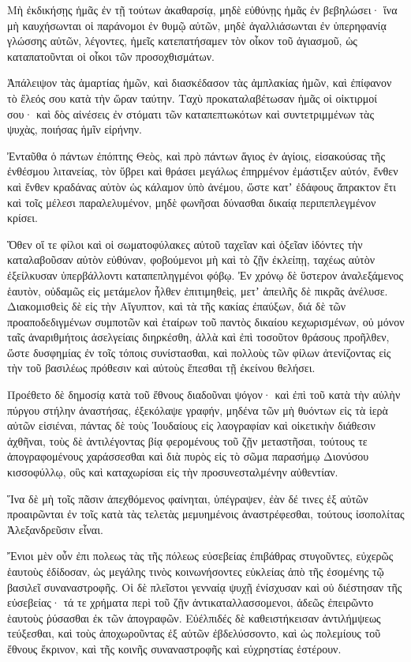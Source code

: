 {Μὴ ἐκδικήσῃς ἡμᾶς ἐν τῇ τούτων ἀκαθαρσίᾳ, μηδὲ εὐθύνῃς ἡμᾶς ἐν βεβηλώσει· ἵνα μὴ καυχήσωνται οἱ παράνομοι ἐν θυμῷ αὐτῶν, μηδὲ ἀγαλλιάσωνται ἐν ὑπερηφανίᾳ γλώσσης αὐτῶν, λέγοντες,
ἡμεῖς κατεπατήσαμεν τὸν οἶκον τοῦ ἁγιασμοῦ, ὡς καταπατοῦνται οἱ οἶκοι τῶν προσοχθισμάτων.
\par }{\PP {}Ἀπάλειψον τὰς ἁμαρτίας ἡμῶν, καὶ διασκέδασον τὰς ἀμπλακίας ἡμῶν, καὶ ἐπίφανον τὸ ἔλεός σου κατὰ τὴν ὥραν ταύτην.
Ταχὺ προκαταλαβέτωσαν ἡμᾶς οἱ οἰκτιρμοί σου· καὶ δὸς αἰνέσεις ἐν στόματι τῶν καταπεπτωκότων καὶ συντετριμμένων τὰς ψυχὰς, ποιήσας ἡμῖν εἰρήνην.
\par }{\PP {}Ἐνταῦθα ὁ πάντων ἐπόπτης Θεὸς, καὶ πρὸ πάντων ἅγιος ἐν ἁγίοις, εἰσακούσας τῆς ἐνθέσμου λιτανείας, τὸν ὕβρει καὶ θράσει μεγάλως ἐπηρμένον ἐμάστιξεν αὐτόν,
ἔνθεν καὶ ἔνθεν κραδάνας αὐτὸν ὡς κάλαμον ὑπὸ ἀνέμου, ὥστε κατʼ ἐδάφους ἄπρακτον ἔτι καὶ τοῖς μέλεσι παραλελυμένον, μηδὲ φωνῆσαι δύνασθαι δικαίᾳ περιπεπλεγμένον κρίσει.
\par }{\PP {}Ὅθεν οἵ τε φίλοι καὶ οἱ σωματοφύλακες αὐτοῦ ταχεῖαν καὶ ὀξεῖαν ἰδόντες τὴν καταλαβοῦσαν αὐτὸν εὐθύναν, φοβούμενοι μὴ καὶ τὸ ζῇν ἐκλείπῃ, ταχέως αὐτὸν ἐξείλκυσαν ὑπερβάλλοντι καταπεπληγμένοι φόβῳ.
Ἐν χρόνῳ δὲ ὕστερον ἀναλεξάμενος ἑαυτὸν, οὐδαμῶς εἰς μετάμελον ἦλθεν ἐπιτιμηθεὶς, μετʼ ἀπειλῆς δὲ πικρᾶς ἀνέλυσε.
Διακομισθεὶς δὲ εἰς τὴν Αἴγυπτον, καὶ τὰ τῆς κακίας ἐπαύξων, διά δὲ τῶν προαποδεδιγμένων συμποτῶν καὶ ἑταίρων τοῦ παντὸς δικαίου κεχωρισμένων,
οὐ μόνον ταῖς ἀναριθμήτοις ἀσελγείαις διηρκέσθη, ἀλλὰ καὶ ἐπὶ τοσοῦτον θράσους προῆλθεν, ὥστε δυσφημίας ἐν τοῖς τόποις συνίστασθαι, καὶ πολλοὺς τῶν φίλων ἀτενίζοντας εἰς τὴν τοῦ βασιλέως πρόθεσιν καὶ αὐτοὺς ἕπεσθαι τῇ ἐκείνου θελήσει.
\par }{\PP {}Προέθετο δὲ δημοσίᾳ κατὰ τοῦ ἔθνους διαδοῦναι ψόγον· καὶ ἐπὶ τοῦ κατὰ τὴν αὐλὴν πύργου στήλην ἀναστήσας, ἐξεκόλαψε γραφήν,
μηδένα τῶν μὴ θυόντων εἰς τὰ ἱερὰ αὐτῶν εἰσιέναι, πάντας δὲ τοὺς Ἰουδαίους εἰς λαογραφίαν καὶ οἰκετικὴν διάθεσιν ἀχθῆναι, τοὺς δὲ ἀντιλέγοντας βίᾳ φερομένους τοῦ ζῇν μεταστῆσαι,
τούτους τε ἀπογραφομένους χαράσσεσθαι καὶ διὰ πυρὸς εἰς τὸ σῶμα παρασήμῳ Διονύσου κισσοφύλλῳ, οὓς καὶ καταχωρίσαι εἰς τὴν προσυνεσταλμένην αὐθεντίαν.
\par }{\PP {}Ἵνα δὲ μὴ τοῖς πᾶσιν ἀπεχθόμενος φαίνηται, ὑπέγραψεν, ἐὰν δέ τινες ἐξ αὐτῶν προαιρῶνται ἐν τοῖς κατὰ τὰς τελετὰς μεμυημένοις ἀναστρέφεσθαι, τούτους ἰσοπολίτας Ἀλεξανδρεῦσιν εἶναι.
\par }{\PP {}Ἔνιοι μὲν οὖν ἐπι πολεως τὰς τῆς πόλεως εὐσεβείας ἐπιβάθρας στυγοῦντες, εὐχερῶς ἑαυτοὺς ἐδίδοσαν, ὡς μεγάλης τινὸς κοινωνήσοντες εὐκλείας ἀπὸ τῆς ἐσομένης τῷ βασιλεῖ συναναστροφῆς.
Οἱ δὲ πλεῖστοι γενναίᾳ ψυχῇ ἐνίσχυσαν καὶ οὐ διέστησαν τῆς εὐσεβείας· τά τε χρήματα περὶ τοῦ ζῇν ἀντικαταλλασσομενοι, ἀδεῶς ἐπειρῶντο ἑαυτοὺς ῥύσασθαι ἐκ τῶν ἀπογραφῶν.
Εὐέλπιδές δὲ καθειστήκεισαν ἀντιλήμψεως τεύξεσθαι, καὶ τοὺς ἀποχωροῦντας ἐξ αὐτῶν ἐβδελύσσοντο, καὶ ὡς πολεμίους τοῦ ἔθνους ἔκρινον, καὶ τῆς κοινῆς συναναστροφῆς καὶ εὐχρηστίας ἐστέρουν.

}
